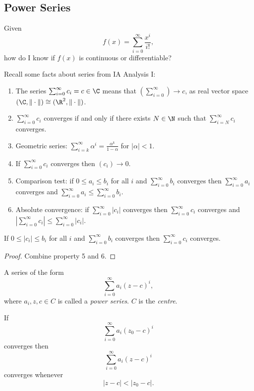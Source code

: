 \documentclass[a4paper]{article}
\theoremstyle{definition}
\begin{document}
\subsection{Power Series}

\begin{question}
  Given
  \[
    f(x) = \sum_{i=0}^{\infty} \frac{x^i}{i!},
  \]
  how do I know if \(f(x)\) is continuous or differentiable?
\end{question}

Recall some facts about series from IA Analysis I:
\begin{enumerate}
\item The series \(\sum_{i=0}^{\infty}c_i = c\in\C \) means that \((\sum_{i=0}^{\infty})\to c\), as real vector space \((\C, \|\cdot\|) \cong (\R^2, \|\cdot\|)\).
\item \(\sum_{i=0}^{\infty}c_i \) converges if and only if there exists \(N\in\N\) such that \(\sum_{i=N}^{\infty}c_i \) converges.
\item Geometric series: \(\sum_{i=k}^{\infty}\alpha^i = \frac{\alpha^k}{1-\alpha} \) for \(|\alpha|<1\).
\item If \(\sum_{i=0}^{\infty}c_i \) converges then \((c_i)\to 0\).
\item Comparison test: if \(0 \leq a_i \leq b_i\) for all \(i\) and \(\sum_{i=0}^{\infty}b_i \) converges then \(\sum_{i=0}^{\infty}a_i \) converges and \(\sum_{i=0}^{\infty}a_i \leq \sum_{i=0}^{\infty}b_i \).
\item Absolute convergence: if \(\sum_{i=0}^{\infty}|c_i| \) converges then \(\sum_{i=0}^{\infty}c_i \) converges and \(|\sum_{i=0}^{\infty}c_i| \leq \sum_{i=0}^{\infty}|c_i| \).
\end{enumerate}

\begin{lemma}
  If \(0 \leq |c_i| \leq b_i \) for all \(i\) and \(\sum_{i=0}^{\infty}b_i \) converges then \(\sum_{i=0}^{\infty}c_i \) converges.
\end{lemma}

\begin{proof}
  Combine property 5 and 6.
\end{proof}

\begin{definition}
A series of the form
\[
\sum_{i=0}^{\infty}a_i(z-c)^i,
\]
where \(a_i,z,c\in C\) is called a \emph{power series}. \(C\) is the \emph{centre}.
\end{definition}

\begin{proposition}
  \label{prop:pointwise convergence of series}
  If
  \[
    \sum_{i=0}^{\infty}a_i(z_0-c)^i
  \]
  converges then
  \[
    \sum_{i=0}^{\infty}a_i(z-c)^i
  \]
  converges whenever
  \[
|z-c| < |z_0-c|.
  \]
\end{proposition}
\end{document}
